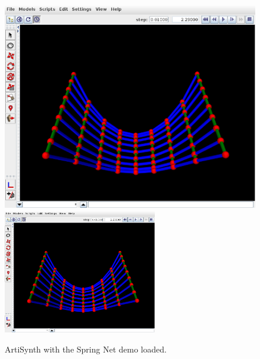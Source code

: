 \begin{figure}[ht]
\begin{center}
\iflatexml
   \includegraphics[]{images/SpringNetDemo}
\else
   \includegraphics[width=0.60\textwidth]{images/SpringNetDemo}
\fi
\end{center}
\caption{ArtiSynth with the Spring Net demo loaded.}
\label{SpringNetDemo:fig}
\end{figure}



